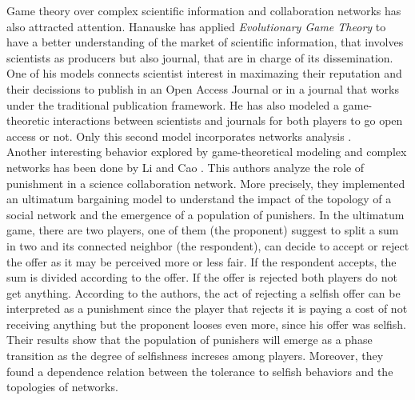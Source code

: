 \documentclass{bmcart}
\begin{document}
Game theory over complex scientific information and collaboration
networks has also attracted attention. Hanauske has applied
\emph{Evolutionary Game Theory} to have a better understanding of the
market of scientific information, that involves scientists as
producers but also journal, that are in charge of its
dissemination. One of his models connects scientist interest in
maximazing their reputation and their decissions to publish in an Open
Access Journal or in a journal that works under the traditional
publication framework. He has also modeled a game-theoretic
interactions between scientists and journals for both players to go
open access or not. Only this second model incorporates networks
analysis \cite{Hanauske-etal:2012}.\\


Another interesting behavior explored by game-theoretical modeling and
complex networks has been done by Li and Cao \cite{Li-etal:2009}. This
authors analyze the role of punishment in a science collaboration
network. More precisely, they implemented an ultimatum bargaining
model to understand the impact of the topology of a social network and
the emergence of a population of punishers. In the ultimatum game,
there are two players, one of them (the proponent) suggest to split a
sum in two and its connected neighbor (the respondent), can decide to
accept or reject the offer as it may be perceived more or less
fair. If the respondent accepts, the sum is divided according to the
offer. If the offer is rejected both players do not get
anything. According to the authors, the act of rejecting a selfish
offer can be interpreted as a punishment since the player that rejects
it is paying a cost of not receiving anything but the proponent looses
even more, since his offer was selfish. Their results show that the
population of punishers will emerge as a phase transition as the
degree of selfishness increses among players. Moreover, they found a
dependence relation between the tolerance to selfish behaviors and the
topologies of networks.\\


\end{document}

